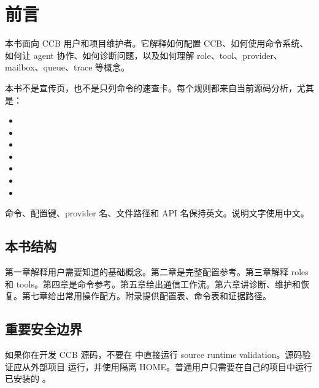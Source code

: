\chapter{前言}

本书面向 CCB 用户和项目维护者。它解释如何配置 CCB、如何使用命令系统、如何让 agent 协作、如何诊断问题，以及如何理解 role、tool、provider、mailbox、queue、trace 等概念。

本书不是宣传页，也不是只列命令的速查卡。每个规则都来自当前源码分析，尤其是：

\begin{itemize}
  \item {}
  \item {}
  \item {}
  \item {}
  \item {}
  \item {}
  \item {}
\end{itemize}

命令、配置键、provider 名、文件路径和 API 名保持英文。说明文字使用中文。

\section{本书结构}

第一章解释用户需要知道的基础概念。第二章是完整配置参考。第三章解释 roles 和 tools。第四章是命令参考。第五章给出通信工作流。第六章讲诊断、维护和恢复。第七章给出常用操作配方。附录提供配置表、命令表和证据路径。

\section{重要安全边界}

如果你在开发 CCB 源码，不要在  中直接运行 source runtime validation。源码验证应从外部项目  运行，并使用隔离 HOME。普通用户只需要在自己的项目中运行已安装的 。
